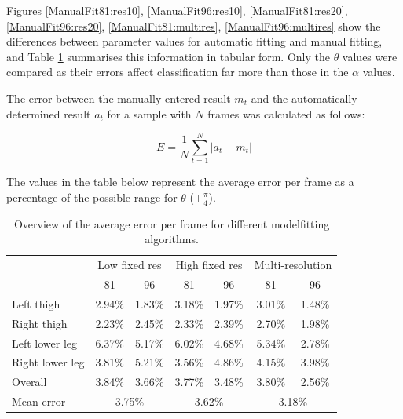 Figures \ref{ManualFit81:res10}, \ref{ManualFit96:res10}, \ref{ManualFit81:res20}, \ref{ManualFit96:res20}, \ref{ManualFit81:multires}, \ref{ManualFit96:multires} show the differences between parameter values for automatic fitting and manual fitting,
and Table \ref{ManualFitTable} summarises this information in tabular form.
Only the $\theta$ values were compared as their errors affect classification far more than those in the $\alpha$ values.

The error between the manually entered result $m_t$ and the automatically determined result $a_t$ for a sample with $N$ frames was calculated as follows:

\begin{equation}
	E = \frac{1}{N} \sum_{t=1}^N \left| a_t - m_t \right|
\end{equation}

The values in the table below represent the average error per frame as a percentage of the possible range for $\theta$ ($\pm \frac{\pi}{4}$).

\begin{table}[thb]
	\centering
	\begin{tabular}{l|cc|cc|cc}
		& \multicolumn{2}{|c|}{Low fixed res} & \multicolumn{2}{|c|}{High fixed res} & \multicolumn{2}{|c}{Multi-resolution} \\
		& 81 & 96 & 81 & 96 & 81 & 96 \\
		\hline
		Left thigh & 2.94\% & 1.83\% & 3.18\% & 1.97\% & 3.01\% & 1.48\% \\
		Right thigh & 2.23\% & 2.45\% & 2.33\% & 2.39\% & 2.70\% & 1.98\% \\
		Left lower leg & 6.37\% & 5.17\% & 6.02\% & 4.68\% & 5.34\% & 2.78\% \\
		Right lower leg & 3.81\% & 5.21\% & 3.56\% & 4.86\% & 4.15\% & 3.98\% \\
		\hline
		Overall & 3.84\% & 3.66\% & 3.77\% & 3.48\% & 3.80\% & 2.56\% \\
		Mean error & \multicolumn{2}{|c|}{3.75\%} & \multicolumn{2}{|c|}{3.62\%} & \multicolumn{2}{|c}{3.18\%} \\
	\end{tabular}
	\caption{Overview of the average error per frame for different modelfitting algorithms.}
	\label{ManualFitTable}
\end{table}

